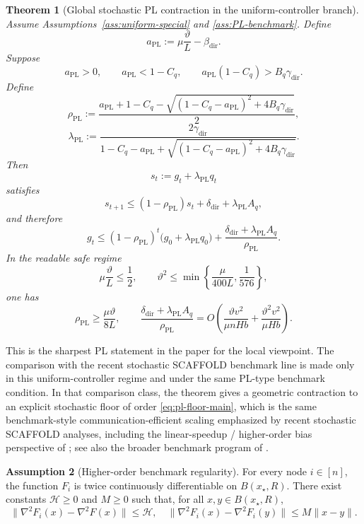 \documentclass{article}
\newtheorem{theorem}{Theorem}[section]
\theoremstyle{definition}
\newtheorem{assumption}[theorem]{Assumption}
\begin{document}
\begin{theorem}[Global stochastic PL contraction in the uniform-controller branch]

Assume Assumptions~\ref{ass:uniform-special} and \ref{ass:PL-benchmark}. Define
\[
a_{\mathrm{PL}}:=\mu\frac{\vartheta}{L}-\beta_{\mathrm{dir}}.
\]
Suppose
\[
a_{\mathrm{PL}}>0,
\qquad
a_{\mathrm{PL}}<1-C_q,
\qquad
a_{\mathrm{PL}}(1-C_q)>B_q\gamma_{\mathrm{dir}}.
\]
Define
\[
\rho_{\mathrm{PL}}
:=
\frac{
a_{\mathrm{PL}}+1-C_q
-
\sqrt{(1-C_q-a_{\mathrm{PL}})^2+4B_q\gamma_{\mathrm{dir}}}
}{2},
\]
\[
\lambda_{\mathrm{PL}}
:=
\frac{
2\gamma_{\mathrm{dir}}
}{
1-C_q-a_{\mathrm{PL}}+
\sqrt{(1-C_q-a_{\mathrm{PL}})^2+4B_q\gamma_{\mathrm{dir}}}
}.
\]
Then
\[
s_t:=g_t+\lambda_{\mathrm{PL}}q_t
\]
satisfies
\[
s_{t+1}
\le
(1-\rho_{\mathrm{PL}})s_t
+
\delta_{\mathrm{dir}}+\lambda_{\mathrm{PL}}A_q,
\]
and therefore
\[
g_t
\le
(1-\rho_{\mathrm{PL}})^t\bigl(g_0+\lambda_{\mathrm{PL}}q_0\bigr)
+
\frac{\delta_{\mathrm{dir}}+\lambda_{\mathrm{PL}}A_q}{\rho_{\mathrm{PL}}}.
\]
In the readable safe regime
\[
\mu\frac{\vartheta}{L}\le \frac12,
\qquad
\vartheta^2\le \min\!\left\{\frac{\mu}{400L},\frac1{576}\right\},
\]
one has
\[
\rho_{\mathrm{PL}}\ge \frac{\mu\vartheta}{8L},
\qquad
\frac{\delta_{\mathrm{dir}}+\lambda_{\mathrm{PL}}A_q}{\rho_{\mathrm{PL}}}
=
O\!\left(\frac{\vartheta v^2}{\mu n H b}+\frac{\vartheta^2 v^2}{\mu H b}\right).
\]
\end{theorem}

This is the sharpest PL statement in the paper for the local viewpoint. The comparison with the recent
stochastic SCAFFOLD benchmark line is made only in this uniform-controller
regime and under the same PL-type benchmark condition. In that comparison
class, the theorem gives a geometric contraction to an explicit stochastic
floor of order \eqref{eq:pl-floor-main}, which is the same benchmark-style
communication-efficient scaling emphasized by recent stochastic SCAFFOLD
analyses, including the linear-speedup / higher-order bias perspective of
\citet{mangold2025scaffold}; see also the broader benchmark program of
\citet{luo2025revisiting}.

\begin{assumption}[Higher-order benchmark regularity]
\label{ass:ho}
For every node $i\in[n]$, the function $F_i$ is twice continuously
differentiable on $B(x_\star,R)$. There exist constants
$\mathcal H\ge 0$ and $M\ge 0$ such that, for all $x,y\in B(x_\star,R)$,
\[
\|\nabla^2 F_i(x)-\nabla^2 F(x)\|\le \mathcal H,\quad\|\nabla^2 F_i(x)-\nabla^2 F_i(y)\|\le M\|x-y\|.
\]
\end{assumption}
\end{document}
